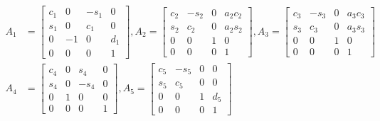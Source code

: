 \begin{align*}
A_1 &= \begin{bmatrix} 
            c_1 & 0 & -s_1 & 0\\
            s_1 & 0 & c_1 & 0\\
            0 & -1 & 0 & d_1\\
            0 & 0 & 0 & 1
        \end{bmatrix},
A_2 = \begin{bmatrix} 
            c_2 & -s_2 & 0 & a_2c_2\\
            s_2 & c_2 & 0 & a_2s_2\\
            0 & 0 & 1 & 0\\
            0 & 0 & 0 & 1
        \end{bmatrix},
A_3 = \begin{bmatrix} 
            c_3 & -s_3 & 0 & a_3c_3\\
            s_3 & c_3 & 0 & a_3s_3\\
            0 & 0 & 1 & 0\\
            0 & 0 & 0 & 1
        \end{bmatrix}\\
A_4 &= \begin{bmatrix} 
            c_4 & 0 & s_4 & 0\\
            s_4 & 0 & -s_4 & 0\\
            0 & 1 & 0 & 0\\
            0 & 0 & 0 & 1
        \end{bmatrix},
A_5 = \begin{bmatrix} 
            c_5 & -s_5 & 0 & 0\\
            s_5 & c_5 & 0 & 0\\
            0 & 0 & 1 & d_5 \\
            0 & 0 & 0 & 1
        \end{bmatrix}
\end{align*}

